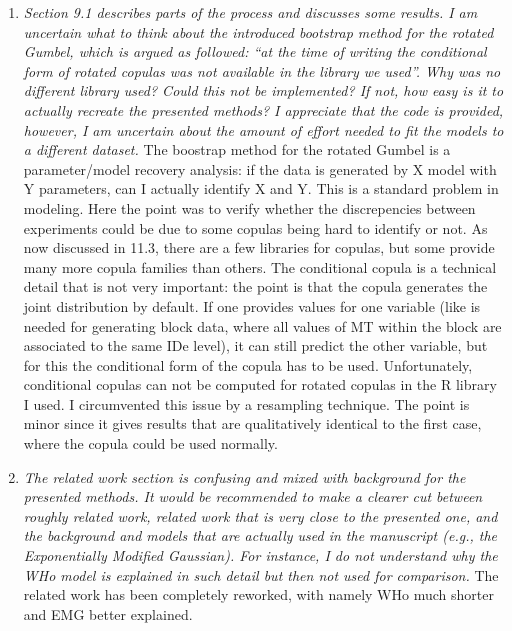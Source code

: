 \documentclass{article}
\begin{document}
\begin{enumerate}
    \item \textit{Section 9.1 describes parts of the process and discusses some results. I am uncertain what to think about the introduced bootstrap method for the rotated Gumbel, which is argued as followed: “at the time of writing the conditional form of rotated copulas was not available in the library we used”. Why was no different library used? Could this not be implemented? If not, how easy is it to actually recreate the presented methods? I appreciate that the code is provided, however, I am uncertain about the amount of effort needed to fit the models to a different dataset.} The boostrap method for the rotated Gumbel is a parameter/model recovery analysis: if the data is generated by X model with Y parameters, can I actually identify X and Y. This is a standard problem in modeling. Here the point was to verify whether the discrepencies between experiments could be due to some copulas being hard to identify or not. As now discussed in 11.3, there are a few libraries for copulas, but some provide many more copula families than others. The conditional copula is a technical detail that is not very important: the point is that the copula generates the joint distribution by default. If one provides values for one variable (like is needed for generating block data, where all values of MT within the block are associated to the same IDe level), it can still predict the other variable, but for this the conditional form of the copula has to be used. Unfortunately, conditional copulas can not be computed for rotated copulas in the R library I used. I circumvented this issue by a resampling technique. The point is minor since it gives results that are qualitatively identical to the first case, where the copula could be used normally.
    \item \textit{The related work section is confusing and mixed with background for the presented methods. It would be recommended to make a clearer cut between roughly related work, related work that is very close to the presented one, and the background and models that are actually used in the manuscript (e.g., the Exponentially Modified Gaussian). For instance, I do not understand why the WHo model is explained in such detail but then not used for comparison. } The related work has been completely reworked, with namely WHo much shorter and EMG better explained.

\end{enumerate}
\end{document}
